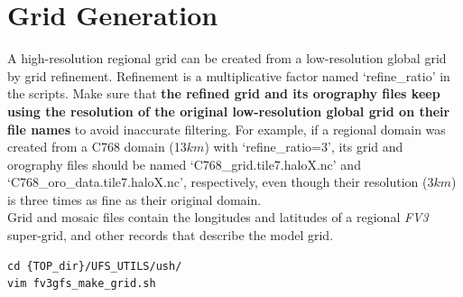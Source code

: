 \documentclass[11pt,fleqn]{report}              %
\begin{document}
\section{Grid Generation}
\label{sec:sar_pre_grid}

A high-resolution regional grid can be created from a low-resolution global grid by grid refinement. Refinement is a multiplicative factor named `refine\_ratio' in the scripts. Make sure that {\bf the refined grid and its orography files keep using the resolution of the original low-resolution global grid on their file names} to avoid inaccurate filtering. For example, if a regional domain was created from a C768 domain (13$km$) with `refine\_ratio=3', its grid and orography files should be named `C768\_grid.tile7.haloX.nc' and `C768\_oro\_data.tile7.haloX.nc', respectively, even though their resolution (3$km$) is three times as fine as their original domain. \\

Grid and mosaic files contain the longitudes and latitudes of a regional {\it FV3} super-grid, and other records that describe the model grid.
\lstset{language=bash}   
\begin{lstlisting}[frame=trBL]
cd {TOP_dir}/UFS_UTILS/ush/
vim fv3gfs_make_grid.sh
\end{lstlisting}
\end{document}
